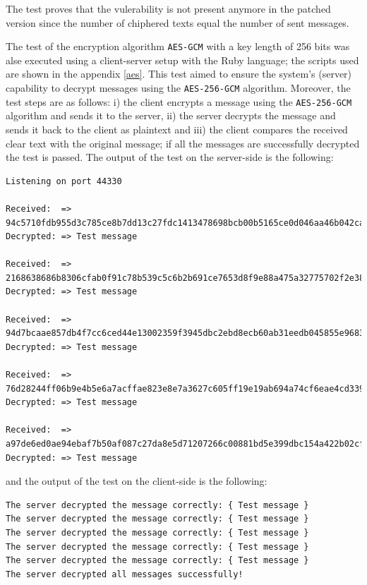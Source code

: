 The test proves that the vulerability is not present anymore in the patched version since the number of chiphered texts equal the number of sent messages.


The test of the encryption algorithm \texttt{AES-GCM} with a key length of 256 bits was alse executed using a client-server setup with the Ruby language; the scripts used are shown in the appendix \ref{aes}. This test aimed to ensure the system's (server) capability to decrypt messages using the \texttt{AES-256-GCM} algorithm. Moreover, the test steps are as follows: i) the client encrypts a message using the \texttt{AES-256-GCM} algorithm and sends it to the server, ii) the server decrypts the message and sends it back to the client as plaintext and iii) the client compares the received clear text with the original message; if all the messages are successfully decrypted the test is passed. The output of the test on the server-side is the following:
\begin{scriptsize}
\begin{verbatim}
Listening on port 44330

Received:  => 94c5710fdb955d3c785ce8b7dd13c27fdc1413478698bcb00b5165ce0d046aa46b042ca5d411d557
Decrypted: => Test message

Received:  => 2168638686b8306cfab0f91c78b539c5c6b2b691ce7653d8f9e88a475a32775702f2e383876c98b9
Decrypted: => Test message

Received:  => 94d7bcaae857db4f7cc6ced44e13002359f3945dbc2ebd8ecb60ab31eedb045855e96837355d4732
Decrypted: => Test message

Received:  => 76d28244ff06b9e4b5e6a7acffae823e8e7a3627c605ff19e19ab694a74cf6eae4cd339e5243ecef
Decrypted: => Test message

Received:  => a97de6ed0ae94ebaf7b50af087c27da8e5d71207266c00881bd5e399dbc154a422b02cf68728499e
Decrypted: => Test message
\end{verbatim}
\end{scriptsize}

and the output of the test on the client-side is the following:
\begin{verbatim}
The server decrypted the message correctly: { Test message }
The server decrypted the message correctly: { Test message }
The server decrypted the message correctly: { Test message }
The server decrypted the message correctly: { Test message }
The server decrypted the message correctly: { Test message }
The server decrypted all messages successfully!
\end{verbatim}


